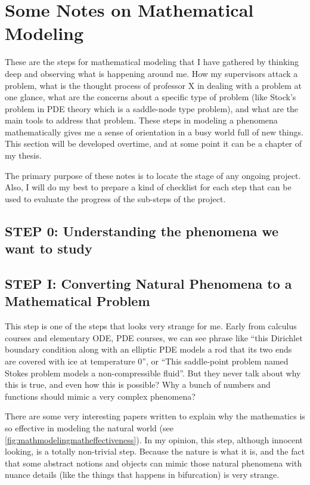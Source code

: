 
\chapter{Some Notes on Mathematical Modeling}
These are the steps for mathematical modeling that I have gathered by thinking deep and observing what is happening around me. How my supervisors attack a problem, what is the thought process of professor X in dealing with a problem at one glance, what are the concerns about a specific type of problem (like Stock's problem in PDE theory which is a saddle-node type problem), and what are the main tools to address that problem. These steps in modeling a phenomena mathematically gives me a sense of orientation in a busy world full of new things. This section will be developed overtime, and at some point it can be a chapter of my thesis.

\begin{summary}
	The primary purpose of these notes is to locate the stage of any ongoing project. Also, I will do my best to prepare a kind of checklist for each step that can be used to evaluate the progress of the sub-steps of the project.
\end{summary}

\section{STEP 0: Understanding the phenomena we want to study}

\section{STEP I: Converting Natural Phenomena to a Mathematical Problem }
This step is one of the steps that looks very strange for me. Early from calculus courses and elementary ODE, PDE courses, we can see phrase like ``this Dirichlet boundary condition along with an elliptic PDE models a rod that its two ends are covered with ice at temperature 0'', or ``This saddle-point problem named Stokes problem models a non-compressible fluid''. But they never talk about why this is true, and even how this is possible? Why a bunch of numbers and functions should mimic a very complex phenomena?

There are some very interesting papers written to explain why the mathematics is so effective in modeling the natural world (see \autoref{fig:mathmodelingmatheffectiveness}). In my opinion, this step, although innocent looking, is a totally non-trivial step. Because the nature is what it is, and the fact that some abstract notions and objects can mimic those natural phenomena with nuance details (like the things that happens in bifurcation) is very strange. 


